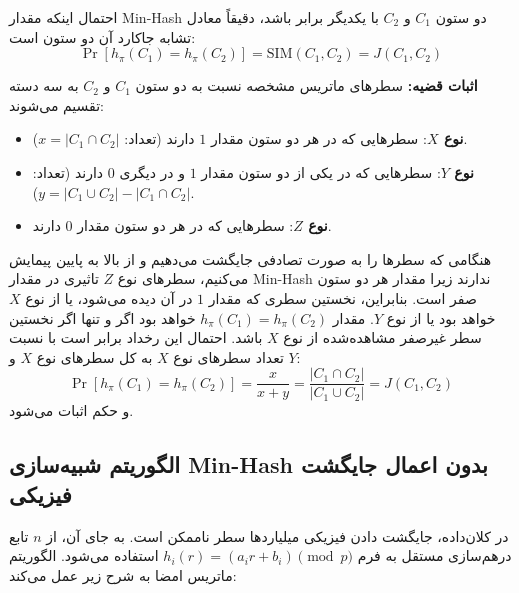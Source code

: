 \begin{theorem}
احتمال اینکه مقدار Min-Hash دو ستون $C_1$ و $C_2$ با یکدیگر برابر باشد، دقیقاً معادل تشابه جاکارد آن دو ستون است:
\begin{equation}
\Pr[h_\pi(C_1) = h_\pi(C_2)] = \text{SIM}(C_1, C_2) = J(C_1, C_2)
\end{equation}
\end{theorem}

\textbf{اثبات قضیه:}
سطرهای ماتریس مشخصه نسبت به دو ستون $C_1$ و $C_2$ به سه دسته تقسیم می‌شوند:
\begin{itemize}
    \item \textbf{نوع $X$}: سطرهایی که در هر دو ستون مقدار $1$ دارند (تعداد: $x = |C_1 \cap C_2|$).
    \item \textbf{نوع $Y$}: سطرهایی که در یکی از دو ستون مقدار $1$ و در دیگری $0$ دارند (تعداد: $y = |C_1 \cup C_2| - |C_1 \cap C_2|$).
    \item \textbf{نوع $Z$}: سطرهایی که در هر دو ستون مقدار $0$ دارند.
\end{itemize}
هنگامی که سطرها را به صورت تصادفی جایگشت می‌دهیم و از بالا به پایین پیمایش می‌کنیم، سطرهای نوع $Z$ تاثیری در مقدار Min-Hash ندارند زیرا مقدار هر دو ستون صفر است. بنابراین، نخستین سطری که مقدار $1$ در آن دیده می‌شود، یا از نوع $X$ خواهد بود یا از نوع $Y$.
مقدار $h_\pi(C_1) = h_\pi(C_2)$ خواهد بود اگر و تنها اگر نخستین سطر غیرصفر مشاهده‌شده از نوع $X$ باشد. احتمال این رخداد برابر است با نسبت تعداد سطرهای نوع $X$ به کل سطرهای نوع $X$ و $Y$:
\begin{equation}
\Pr[h_\pi(C_1) = h_\pi(C_2)] = \frac{x}{x + y} = \frac{|C_1 \cap C_2|}{|C_1 \cup C_2|} = J(C_1, C_2)
\end{equation}
و حکم اثبات می‌شود.

\subsection{الگوریتم شبیه‌سازی Min-Hash بدون اعمال جایگشت فیزیکی}
در کلان‌داده، جایگشت دادن فیزیکی میلیاردها سطر ناممکن است. به جای آن، از $n$ تابع درهم‌سازی مستقل به فرم $h_i(r) = (a_i r + b_i) \pmod p$ استفاده می‌شود. الگوریتم ماتریس امضا به شرح زیر عمل می‌کند:

